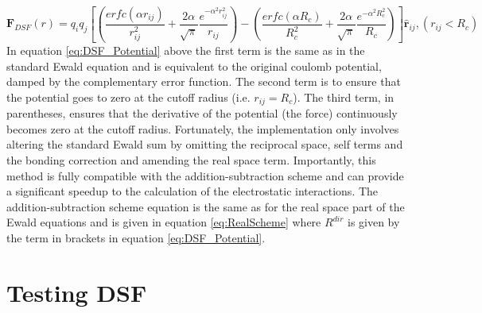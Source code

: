 \begin{equation}
  \mathbf{F}_{DSF}(r) = q_i q_j \left[ \left( \frac{erfc(\alpha r_{ij})}{r_{ij}^2} + \frac{2 \alpha}{\sqrt{\pi}} \frac{e^{-\alpha^2 r_{ij}^2}}{r_{ij}}\right) - \left(\frac{erfc(\alpha                   R_{c})}{R_{c}^2} + \frac{2 \alpha}{\sqrt{\pi}} \frac{e^{-\alpha^2 R_{c}^2}}{R_{c}} \right) \right] \hat{\mathbf{r}}_{ij} , (r_{ij} < R_{c})
  \label{eq:DSF_Force}
\end{equation}
In equation \eqref{eq:DSF_Potential} above the first term is the same as in the standard Ewald equation and is equivalent to the original coulomb potential, damped by the complementary error function. The second term is to ensure that the potential goes to zero at the cutoff radius (i.e. $r_{ij} = R_{c}$). The third term, in parentheses, ensures that the derivative of the potential (the force) continuously becomes zero at the cutoff radius. Fortunately, the implementation only involves altering the standard Ewald sum by omitting the reciprocal space, self terms and the bonding correction and amending the real space term. Importantly, this method is fully compatible with the addition-subtraction scheme and can provide a significant speedup to the calculation of the electrostatic interactions. The addition-subtraction scheme equation is the same as for the real space part of the Ewald equations and is given in equation \eqref{eq:RealScheme} where $R^{dir}$ is given by the term in brackets in equation \eqref{eq:DSF_Potential}. 
\section{Testing DSF}
